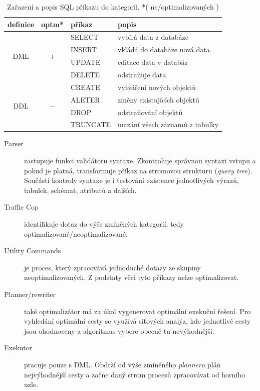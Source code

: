 \documentclass[a4paper,12pt,oneside]{report}
\begin{document}
\begin{table}[h]
   \centering
\begin{tabular}{|ccll|}
\hline
definice & optm* & příkaz & popis \\ \hline \hline
\multirow{4}{*}{DML} & \multirow{4}{*}{$+$} & SELECT & vybírá data z databáze \\
 &  & INSERT & vkládá do databáze nová data. \\
 &  & UPDATE & editace data v databáz \\
 &  & DELETE & odstraňuje data \\ \hline
\multirow{4}{*}{DDL} & \multirow{4}{*}{$-$} & CREATE & vytváření nových objektů \\
 &  & ALETER & změny existujících objektů \\
 &  & DROP & odstraňování objektů \\
 &  & TRUNCATE & mazání všech záznamů z tabulky \\ \hline
\end{tabular}

\caption{Zařazení a popis SQL příkazu do kategorii.
*( ne/optimalizovaných )}
\label{tab:prikazy}
\end{table}


\begin{description}
\item[Parser]zastupuje funkci validátoru syntaxe. Zkontroluje správnou syntaxi vstupu a pokud je platná, transformuje příkaz na stromovou strukturu (\textit{query tree}). Součástí kontroly syntaxe je i testování existence jednotlivých výrazů, tabulek, schémat, atributů a dalších.

\item[Traffic Cop] identifikuje dotaz do výše zmíněných kategorií, tedy optimalizované\-/neoptimalizované.

\item[Utility Commands] je proces, který zpracovává jednoduché dotazy ze skupiny neoptimalizovaných. Z podstaty věci tyto příkazy nelze  optimalizovat.

\item[Planner/rewriter] také optimalizátor má za úkol vygenerovat optimální exekuční řešení. Pro vyhledání optimální cesty se využívá síťových analýz, kde jednotlivé cesty jsou  ohodnoceny a algoritmus vybere obecně tu nevýhodnější.

\item[Exekutor] pracuje pouze s \acs{DML}. Obdrží od výše zmíněného \textit{planneru} plán nejvýhodnější cesty a začne daný strom procesů zpracovávat od horního uzle.
\end{description}
\end{document}
